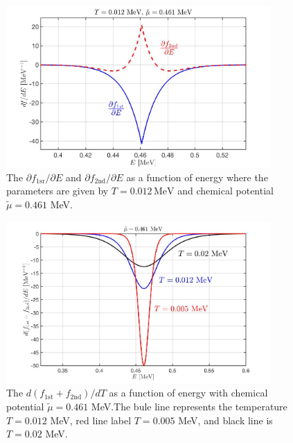 \documentclass[sn-mathphys,Numbered]{sn-jnl}
\theoremstyle{thmstyleone}%
\theoremstyle{thmstyletwo}%
\theoremstyle{thmstylethree}%
\begin{document}
\begin{figure}[ht]
\begin{center}
\includegraphics[width=0.9\textwidth]{./plot/dfdE_NovelFermi}
\caption{The $\partial f_{\mathrm{1sr}}/{\partial E}$ and $\partial f_{\mathrm{2nd}}/{\partial E}$ as a function of energy where the parameters are given by $T=0.012\,\mathrm{MeV}$ and chemical potential $\tilde\mu=0.461$ MeV.}
\label{dfdE_fig}
\end{center}
\end{figure}
\begin{figure}[ht]
\begin{center}
\includegraphics[width=0.9\textwidth]{./plot/dfdE_NovelFermi002}
\caption{
The $d(f_\mathrm{1st}+f_\mathrm{2nd})/dT$ as a function of energy with chemical potential $\tilde\mu=0.461$ MeV.The bule line represents the temperature $T=0.012$ MeV, red line label $T=0.005$ MeV, and black line is $T=0.02$ MeV.}
\label{dfdE_tot_fig}
\end{center}
\end{figure}
\end{document}
